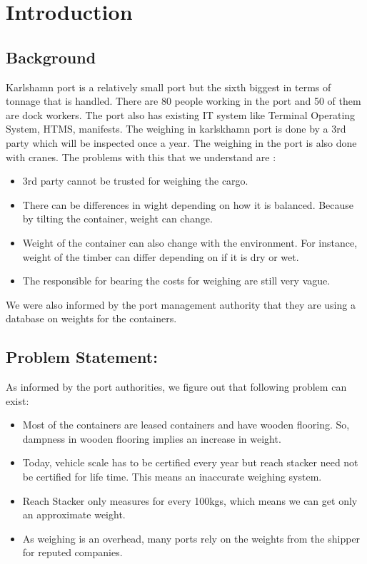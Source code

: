 \section{Introduction}

\subsection{Background}

Karlshamn port is a relatively small port but the sixth biggest in terms of tonnage that is handled. There are 80 people working in the port and 50 of them are dock workers. The port also has existing IT system like Terminal Operating System, HTMS, manifests. The weighing in karlskhamn port is done by a 3rd party which will be inspected once a year. The weighing in the port is also done with cranes. The problems with this that we understand are :
\begin{itemize}
\item{} 3rd party cannot be trusted for weighing the cargo. 
\item{} There can be differences in wight depending on how it is balanced. Because by tilting the container, weight can change.
\item{} Weight of the container can also change with the environment. For instance, weight of the timber can differ depending on if it is dry or wet. 
\item{} The responsible for bearing the costs for weighing are still very vague. 
\end{itemize}

We were also informed by the port management authority that they are using a database on weights for the containers.

\subsection{Problem Statement:}

As informed by the port authorities, we figure out that following problem can exist: 

\begin{itemize}
\item{}Most of the containers are leased containers and have wooden flooring. So, dampness in wooden flooring implies an increase in weight.
\item{}Today, vehicle scale has to be certified every year but reach stacker need not be certified for life time. This means an inaccurate weighing system.
\item{}Reach Stacker only measures for every 100kgs, which means we can get only an approximate weight. 
\item{}As weighing is an overhead, many ports rely on the weights from the shipper for reputed companies. 

\end{itemize} 
  
